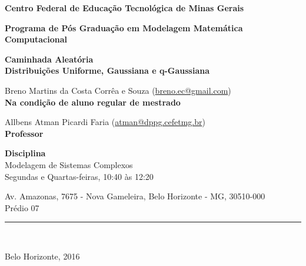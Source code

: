 
\hypersetup{pageanchor=false}

\begin{titlepage}
  \begin{center}
    {\large
    \textbf{Centro Federal de Educação Tecnológica de Minas Gerais}
    }

    \vspace{0.5cm}

    {\normalsize
    \textbf{Programa de Pós Graduação em Modelagem Matemática Computacional}
    }

    \vspace{2.5cm}

    {\LARGE \textbf{Caminhada Aleatória}} \\
    \vspace{0.5cm}
    {\Large \textbf{Distribuições Uniforme, Gaussiana e q-Gaussiana}}

    \vspace{3.5cm}
  \end{center}

  Breno Martins da Costa Corrêa e Souza
  (\href{mailto:breno.ec@gmail.com}{breno.ec@gmail.com}) \\
  \indent \textbf{Na condição de aluno regular de mestrado}

  \vspace{1cm}

  Allbens Atman Picardi Faria
  (\href{mailto:atman@dppg.cefetmg.br}{atman@dppg.cefetmg.br}) \\
  \indent \textbf{Professor}

  \vspace{1cm}

  \begin{center}
    \textbf{Disciplina} \\
    Modelagem de Sistemas Complexos \\
    Segundas e Quartas-feiras, 10:40 às 12:20 \\

    \vspace{1cm}

    Av.  Amazonas, 7675 - Nova Gameleira, Belo Horizonte - MG, 30510-000 \\
    Prédio 07 \\

    \vspace{3.5cm}

    \rule[1pt]{360pt}{1pt} \\

    \vspace{0.5cm}

    Belo Horizonte, 2016

  \end{center}

  \pagebreak
\end{titlepage}

\hypersetup{pageanchor=true}
